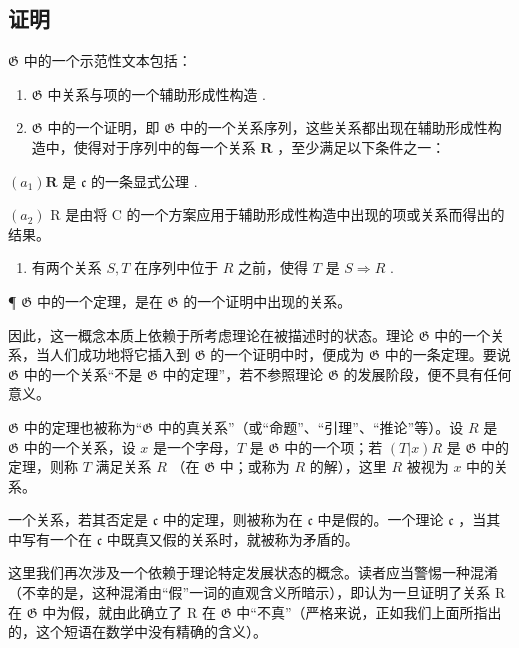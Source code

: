 \subsection{证明}

\(\mathfrak{G}\) 中的一个示范性文本包括：

\begin{enumerate}
\def\labelenumi{(\arabic{enumi})}
\item
  \(\mathfrak{G}\) 中关系与项的一个辅助形成性构造 .
\item
  \(\mathfrak{G}\) 中的一个证明，即 \(\mathfrak{G}\) 中的一个关系序列，这些关系都出现在辅助形成性构造中，使得对于序列中的每一个关系 \(\pmb{R}\) ，至少满足以下条件之一：
\end{enumerate}

\((a_{1})\boldsymbol{R}\) 是 \(\mathfrak{c}\) 的一条显式公理 .

\((a_{2})\) R 是由将 C 的一个方案应用于辅助形成性构造中出现的项或关系而得出的结果。

\begin{enumerate}
\def\labelenumi{(\alph{enumi})}
\setcounter{enumi}{1}
\tightlist
\item
  有两个关系 \(S, T\) 在序列中位于 \(R\) 之前，使得 \(T\) 是 \(S \Longrightarrow R\) .
\end{enumerate}

¶ \(\mathfrak{G}\) 中的一个定理，是在 \(\mathfrak{G}\) 的一个证明中出现的关系。

因此，这一概念本质上依赖于所考虑理论在被描述时的状态。理论 \(\mathfrak{G}\) 中的一个关系，当人们成功地将它插入到 \(\mathfrak{G}\) 的一个证明中时，便成为 \(\mathfrak{G}\) 中的一条定理。要说 \(\mathfrak{G}\) 中的一个关系``不是 \(\mathfrak{G}\) 中的定理''，若不参照理论 \(\mathfrak{G}\) 的发展阶段，便不具有任何意义。

\(\mathfrak{G}\) 中的定理也被称为“\(\mathfrak{G}\) 中的真关系”（或“命题”、“引理”、“推论”等）。设 \(R\) 是 \(\mathfrak{G}\) 中的一个关系，设 \(x\) 是一个字母，\(T\) 是 \(\mathfrak{G}\) 中的一个项；若 \((T|x)R\) 是 \(\mathfrak{G}\) 中的定理，则称 \(T\) 满足关系 \(R\) （在 \(\mathfrak{G}\) 中；或称为 \(R\) 的解），这里 \(R\) 被视为 \(x\) 中的关系。

一个关系，若其否定是 \(\mathfrak{c}\) 中的定理，则被称为在 \(\mathfrak{c}\) 中是假的。一个理论 \(\mathfrak{c}\) ，当其中写有一个在 \(\mathfrak{c}\) 中既真又假的关系时，就被称为矛盾的。

这里我们再次涉及一个依赖于理论特定发展状态的概念。读者应当警惕一种混淆（不幸的是，这种混淆由“假”一词的直观含义所暗示），即认为一旦证明了关系 R 在 \(\mathfrak{G}\) 中为假，就由此确立了 R 在 \(\mathfrak{G}\) 中“不真”（严格来说，正如我们上面所指出的，这个短语在数学中没有精确的含义）。

